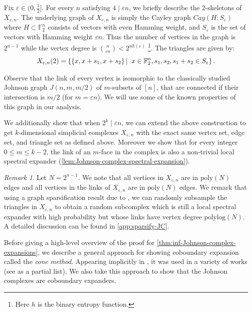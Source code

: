 \documentclass[10pt,a4paper]{article}
\newcommand{\prettyref}[1]{\cref{#1}}
\theoremstyle{definition}
\theoremstyle{remark}
\newtheorem{remark}[theorem]{Remark}
\newcommand\sett[2]{\left\{ #1 \left| \; \vphantom{#1 #2} \right. #2  \right\}}
\newcommand{\F}{\mathbb{F}}
\renewcommand{\le}{\leqslant}
\numberwithin{equation}{section}
\let\pref=\prettyref
\begin{document}

 Fix $\varepsilon \in (0,\frac{1}{2}]$. For every $n$ satisfying $4\;|\;\varepsilon n$, we briefly describe the $2$-skeletons of $X_{\varepsilon,n}$. The underlying graph of $X_{\varepsilon,n}$ is simply the Cayley graph $Cay(H; S_\varepsilon)$ where $H\subset \F_2^n$ consists of vectors with even Hamming weight, and $S_\varepsilon$ is the set of vectors with Hamming weight $\varepsilon n$. Thus the number of vertices in the graph is $2^{n-1}$ while the vertex degree is $\binom{n}{\varepsilon n} < 2^{nh(\varepsilon)}$ \footnote{Here $h$ is the binary entropy function.}. The triangles are given by:
\[X_{\varepsilon,n}(2) = \sett{ \{x, x+s_1, x+s_2\} }{x\in \F_2^n, s_1,s_2, s_1+s_2 \in S_\varepsilon}.\]

Observe that the link of every vertex is isomorphic to the classically studied Johnson graph \(J(n,m,m/2)\) of \(m\)-subsets of \([n]\), that are connected if their intersection is \(m/2\) (for \(m=\varepsilon n\)). We will use some of the known properties of this graph in our analysis.

We additionally show that when $2^k \;|\; \varepsilon n$, we can extend the above construction to get $k$-dimensional simplicial complexes $X_{\varepsilon,n}$ with the exact same vertex set, edge set, and triangle set as defined above. Moreover we show that for every integer $0\le m \le k-2$, the link of an $m$-face in the complex is also a non-trivial local spectral expander (\pref{lem:Johnson-complex-spectral-expansion}).

\begin{remark}
    Let $N = 2^{n-1}$.
    We note that all vertices in $X_{\varepsilon,n}$ are in $\mathrm{poly}(N)$ edges and all vertices in the links of $X_{\varepsilon, n}$ are in $\mathrm{poly}(N)$ edges. 
    We remark that using a graph sparsification result due to \cite{ChungH07}, we can randomly subsample the triangles in $X_{\varepsilon,n}$ to obtain a random subcomplex which is still a local spectral expander with high probability but whose links have vertex degree $\mathrm{polylog}(N)$. A detailed discussion can be found in \pref{app:sparsify-JC}.
\end{remark}

Before giving a high-level overview of the proof for \pref{thm:inf-Johnson-complex-expansions}, we describe a general approach for showing coboundary expansion called the \emph{cone method}. Appearing implicitly in \cite{Gromov2010}, it was used in a variety of works (see \cite{LubotzkyMM2016,KozlovM2019,KaufmanO2021} as a partial list). We also take this approach to show that the Johnson complexes are coboundary expanders.
\end{document}
